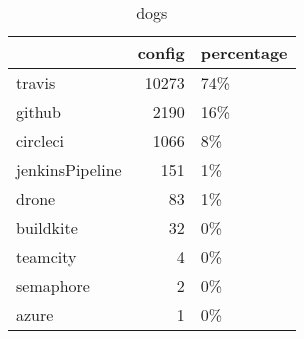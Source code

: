 \begin {table}[!htbp]

\caption{dogs}
\begin{tabular}{lrl}
\hline
{} &  config & percentage \\ \hline

travis          &   10273 &        74\% \\ \hline
github          &    2190 &        16\% \\ \hline
circleci        &    1066 &         8\% \\ \hline
jenkinsPipeline &     151 &         1\% \\ \hline
drone           &      83 &         1\% \\ \hline
buildkite       &      32 &         0\% \\ \hline
teamcity        &       4 &         0\% \\ \hline
semaphore       &       2 &         0\% \\ \hline
azure           &       1 &         0\% \\ \hline

\end{tabular}
\end{table}
